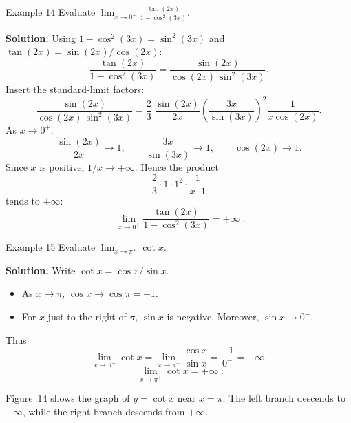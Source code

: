 \begin{examplebox}{Example 14}
Evaluate \(\displaystyle \lim_{x \to 0^{+}} \frac{\tan(2x)}{1 - \cos^{2}(3x)}\).

\medskip
\textbf{Solution.}
Using \(1 - \cos^{2}(3x) = \sin^{2}(3x)\) and \(\tan(2x) = \sin(2x)/\cos(2x)\):
\[
\frac{\tan(2x)}{1 - \cos^{2}(3x)}
= \frac{\sin(2x)}{\cos(2x)\,\sin^{2}(3x)}.
\]
Insert the standard-limit factors:
\[
\frac{\sin(2x)}{\cos(2x)\,\sin^{2}(3x)}
= \frac{2}{3}\;
\frac{\sin(2x)}{2x}
\left(\frac{3x}{\sin(3x)}\right)^{\!2}
\frac{1}{x\cos(2x)}.
\]
As \(x \to 0^{+}\):
\[
\frac{\sin(2x)}{2x} \to 1,\qquad
\frac{3x}{\sin(3x)} \to 1,\qquad
\cos(2x) \to 1.
\]
Since \(x\) is positive, \(1/x \to +\infty\). Hence the product
\[
\frac{2}{3} \cdot 1 \cdot 1^{2} \cdot \frac{1}{x \cdot 1}
\]
tends to \(+\infty\):
\[
\boxed{\;\lim_{x \to 0^{+}} \frac{\tan(2x)}{1 - \cos^{2}(3x)} = +\infty\;}.
\]
\end{examplebox}

\begin{examplebox}{Example 15}
Evaluate \(\displaystyle \lim_{x \to \pi^{+}} \cot x\).

\medskip
\textbf{Solution.}
Write \(\cot x = \cos x / \sin x\).
\begin{itemize}
    \item As \(x \to \pi\), \(\cos x \to \cos\pi = -1\).
    \item For \(x\) just to the right of \(\pi\), \(\sin x\) is negative. Moreover, \(\sin x \to 0^{-}\).
\end{itemize}
Thus
\[
\lim_{x \to \pi^{+}} \cot x
= \lim_{x \to \pi^{+}} \frac{\cos x}{\sin x}
= \frac{-1}{0^{-}}
= +\infty.
\]
\[
\boxed{\;\lim_{x \to \pi^{+}} \cot x = +\infty\;}.
\]
\end{examplebox}

Figure~14 shows the graph of \(y = \cot x\) near \(x = \pi\). The left branch descends to \(-\infty\), while the right branch descends from \(+\infty\).

